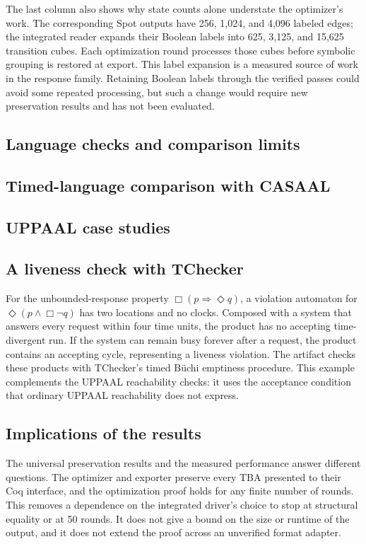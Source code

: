 \documentclass{ieeeaccess}
\begin{document}
The last column also shows why state counts alone understate the optimizer's
work. The corresponding Spot outputs have 256, 1,024, and 4,096 labeled
edges; the integrated reader expands their Boolean labels into 625, 3,125,
and 15,625 transition cubes. Each optimization round processes those cubes
before symbolic grouping is restored at export. This label expansion is a
measured source of work in the response family. Retaining Boolean labels
through the verified passes could avoid some repeated processing, but such a
change would require new preservation results and has not been evaluated.

\subsection{Language checks and comparison limits}


\subsection{Timed-language comparison with CASAAL}


\subsection{UPPAAL case studies}


\subsection{A liveness check with TChecker}
For the unbounded-response property $\Box(p\Rightarrow\Diamond q)$, a
violation automaton for $\Diamond(p\land\Box\neg q)$ has two locations and
no clocks. Composed with a system that answers every request within four
time units, the product has no accepting time-divergent run. If the system
can remain busy forever after a request, the product contains an accepting
cycle, representing a liveness violation. The artifact checks these products
with TChecker's timed B\"uchi emptiness procedure. This example complements
the UPPAAL reachability checks: it uses the acceptance condition that ordinary
UPPAAL reachability does not express.

\subsection{Implications of the results}
The universal preservation results and the measured performance answer
different questions. The optimizer and exporter preserve every TBA presented
to their Coq interface, and the optimization proof holds for any finite number
of rounds. This removes a dependence on the integrated driver's choice to stop
at structural equality or at 50 rounds. It does not give a bound on the size or
runtime of the output, and it does not extend the proof across an unverified
format adapter.
\end{document}
